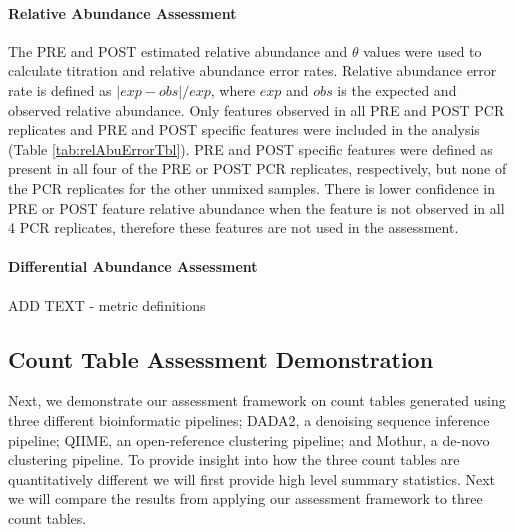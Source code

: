 \documentclass[linenumbers]{bmcart}
\begin{document}
\paragraph*{Relative Abundance Assessment}
The PRE and POST
estimated relative abundance and \(\theta\) values were used to
calculate titration and relative abundance error rates. Relative
abundance error rate is defined as \(|exp - obs|/exp\), where \(exp\)
and \(obs\) is the expected and observed relative abundance.
Only features observed in all PRE and POST PCR replicates
and PRE and POST specific features were included in the analysis (Table
\ref{tab:relAbuErrorTbl}). PRE and POST specific features were defined
as present in all four of the PRE or POST PCR replicates, respectively,
but none of the PCR replicates for the other unmixed samples. There is
lower confidence in PRE or POST feature relative abundance when the
feature is not observed in all 4 PCR replicates, therefore these features
are not used in the assessment.


\paragraph*{Differential Abundance Assessment}
ADD TEXT - metric definitions

\subsection*{Count Table Assessment Demonstration}
Next, we demonstrate our assessment framework on count tables generated using
three different bioinformatic pipelines; DADA2, a denoising sequence inference pipeline; QIIME, an open-reference clustering pipeline; and Mothur, a de-novo clustering pipeline. To provide insight into how the three count tables are quantitatively different we will first provide high level summary statistics. Next we will compare the results from applying our assessment framework to three count tables.
\end{document}
